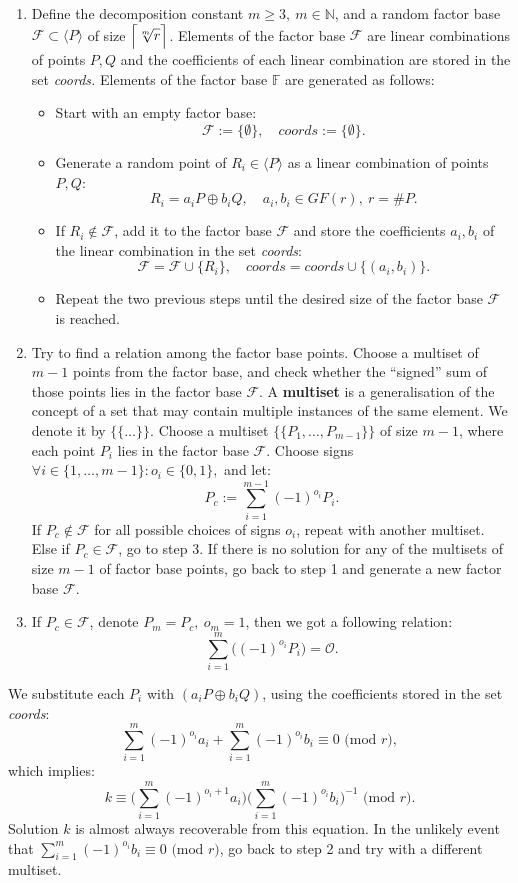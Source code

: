 \documentclass[thesis=M,english]{FITthesis}[2012/10/20]
\theoremstyle{remark}
\theoremstyle{definition}
\begin{document}
\begin{enumerate}
\item Define the decomposition constant $m \geq 3,\ m \in \mathbb{N}$, and a random factor base $\mathcal{F} \subset \langle P \rangle$ of size $\mathlarger{\Big\lceil \sqrt[m]{r} \Big\rceil}$. Elements of the factor base $\mathcal{F}$ are linear combinations of points $P,Q$ and the coefficients of each linear combination are stored in the set \textit{coords.} Elements of the factor base $\mathbb{F}$ are generated as follows:
\begin{itemize}
\item Start with an empty factor base:
$$
\mathcal{F} := \{\emptyset \}, \quad \textit{coords} := \{\emptyset \}.
$$
\item Generate a random point of $R_i \in \langle P \rangle$ as a linear combination of points $P,Q$:
$$
R_i = a_iP \oplus b_iQ, \quad a_i,b_i \in GF(r),\ r = \#P.
$$
\item If $R_i \not\in \mathcal{F}$, add it to the factor base $\mathcal{F}$ and store the coefficients $a_i,b_i$ of the linear combination in the set \textit{coords}:
$$
\mathcal{F} = \mathcal{F} \cup \{R_i\},\quad \textit{coords} = \textit{coords} \cup \{(a_i, b_i)\}.
$$
\item Repeat the two previous steps until the desired size of the factor base $\mathcal{F}$ is reached.
\end{itemize}
\item Try to find a relation among the factor base points. Choose a multiset of $m-1$ points from the factor base, and check whether the \enquote{signed} sum of those points lies in the factor base $\mathcal{F}$. A \textbf{multiset} is a generalisation of the concept of a set that may contain multiple instances of the same element. We denote it by $\{\{ \ldots \}\}.$
Choose a multiset $\{\{P_1, \ldots, P_{m-1} \}\}$ of size $m-1$, where each point $P_i$ lies in the factor base $\mathcal{F}$. Choose signs $\forall i \in \{1, \ldots, m-1\}: o_i \in \{0,1\},$ and let:
$$
P_c := \sum_{i=1}^{m-1}(-1)^{o_i}P_i.
$$
If $P_c \not\in \mathcal{F}$ for all possible choices of signs $o_i$, repeat with another multiset. Else if $P_c \in \mathcal{F}$, go to step 3. If there is no solution for any of the multisets of size $m-1$ of factor base points, go back to step 1 and generate a new factor base $\mathcal{F}$.
\item If $P_c \in \mathcal{F}$, denote $P_m = P_c,\ o_m = 1$, then we got a following relation:
$$
\sum_{i=1}^{m}\Big((-1)^{o_i}P_i \Big) = \mathcal{O}.
$$
\end{enumerate}
We substitute each $P_i$ with $(a_iP \oplus b_iQ)$, using the coefficients stored in the set \textit{coords}:
$$
\sum_{i=1}^m(-1)^{o_i}a_i + \sum_{i=1}^m(-1)^{o_i}b_i \equiv 0 \text{ (mod $r$)}, $$
which implies:
$$
k \equiv \bigg(\sum_{i=1}^m(-1)^{o_i + 1}a_i\bigg)\bigg(\sum_{i=1}^m(-1)^{o_i}b_i\bigg)^{-1} \text{ (mod $r$)}.
$$
Solution $k$ is almost always recoverable from this equation. In the unlikely event that $\sum_{i=1}^m (-1)^{o_i}b_i \equiv 0 \text{ (mod $r$)}$, go back to step 2 and try with a different multiset.
\end{document}
